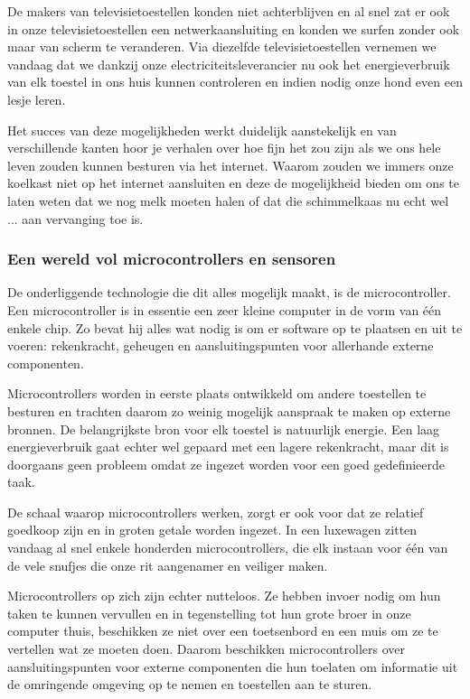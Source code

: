 \documentclass[DIV=calc,paper=a4,fontsize=11pt,twocolumn]{scrartcl}
\newcommand{\heading}[1]{
\subsubsection*{#1}
\vspace{-2mm}
}
\begin{document}
De makers van televisietoestellen konden niet achterblijven en al snel zat er
ook in onze televisietoestellen een netwerkaansluiting en konden we surfen
zonder ook maar van scherm te veranderen. Via diezelfde televisietoestellen
vernemen we vandaag dat we dankzij onze electriciteitsleverancier nu ook het
energieverbruik van elk toestel in ons huis kunnen controleren en indien nodig
onze hond even een lesje leren.

Het succes van deze mogelijkheden werkt duidelijk aanstekelijk en van
verschillende kanten hoor je verhalen over hoe fijn het zou zijn als we ons
hele leven zouden kunnen besturen via het internet. Waarom zouden we immers
onze koelkast niet op het internet aansluiten en deze de mogelijkheid bieden om
ons te laten weten dat we nog melk moeten halen of dat die schimmelkaas nu echt
wel ... aan vervanging toe is.

\heading{Een wereld vol microcontrollers en sensoren}

De onderliggende technologie die dit alles mogelijk maakt, is de
microcontroller. Een microcontroller is in essentie een zeer kleine computer in
de vorm van \'e\'en enkele chip. Zo bevat hij alles wat nodig is om er software
op te plaatsen en uit te voeren: rekenkracht, geheugen en aansluitingspunten
voor allerhande externe componenten.

Microcontrollers worden in eerste plaats ontwikkeld om andere toestellen te
besturen en trachten daarom zo weinig mogelijk aanspraak te maken op externe
bronnen. De belangrijkste bron voor elk toestel is natuurlijk energie. Een laag
energieverbruik gaat echter wel gepaard met een lagere rekenkracht, maar dit is
doorgaans geen probleem omdat ze ingezet worden voor een goed gedefinieerde
taak.

De schaal waarop microcontrollers werken, zorgt er ook voor dat ze relatief
goedkoop zijn en in groten getale worden ingezet. In een luxewagen zitten
vandaag al snel enkele honderden microcontrollers, die elk instaan voor \'e\'en
van de vele snufjes die onze rit aangenamer en veiliger maken.

Microcontrollers op zich zijn echter nutteloos. Ze hebben invoer nodig om hun
taken te kunnen vervullen en in tegenstelling tot hun grote broer in onze
computer thuis, beschikken ze niet over een toetsenbord en een muis om ze te
vertellen wat ze moeten doen. Daarom beschikken microcontrollers over
aansluitingspunten voor externe componenten die hun toelaten om informatie uit
de omringende omgeving op te nemen en toestellen aan te sturen.
\end{document}
